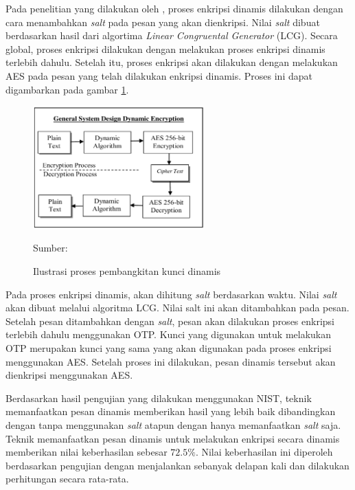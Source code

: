 Pada penelitian yang dilakukan oleh \textcite{bachtiar2018}, proses enkripsi dinamis dilakukan dengan cara menambahkan \emph{salt} pada pesan yang akan dienkripsi. Nilai \emph{salt} dibuat berdasarkan hasil dari algortima \emph{Linear Congruental Generator} (LCG). Secara global, proses enkripsi dilakukan dengan melakukan proses enkripsi dinamis terlebih dahulu. Setelah itu, proses enkripsi akan dilakukan dengan melakukan AES pada pesan yang telah dilakukan enkripsi dinamis. Proses ini dapat digambarkan pada gambar \ref{fig:bachtiar.enc.process}.

\begin{figure}[!h]
  \centering
  \includegraphics[width=250px]{chapters/res/chapter-2/img/bachtiar.enc.process.png}
  \caption{Ilustrasi proses pembangkitan kunci dinamis} \label{fig:bachtiar.enc.process}
  Sumber: \textcite{bachtiar2018}
\end{figure}

Pada proses enkripsi dinamis, akan dihitung \emph{salt} berdasarkan waktu. Nilai \emph{salt} akan dibuat melalui algoritma LCG.  Nilai salt ini akan ditambahkan pada pesan. Setelah pesan ditambahkan dengan \emph{salt}, pesan akan dilakukan proses enkripsi terlebih dahulu menggunakan OTP. Kunci yang digunakan untuk melakukan OTP merupakan kunci yang sama yang akan digunakan pada proses enkripsi menggunakan AES. Setelah proses ini dilakukan, pesan dinamis tersebut akan dienkripsi menggunakan AES.

Berdasarkan hasil pengujian yang dilakukan menggunakan NIST, teknik memanfaatkan pesan dinamis memberikan hasil yang lebih baik dibandingkan dengan tanpa menggunakan \emph{salt} atapun dengan hanya memanfaatkan \emph{salt} saja. Teknik memanfaatkan pesan dinamis untuk melakukan enkripsi secara dinamis memberikan nilai keberhasilan sebesar $72.5\%$. Nilai keberhasilan ini diperoleh berdasarkan pengujian dengan menjalankan sebanyak delapan kali dan dilakukan perhitungan secara rata-rata.
